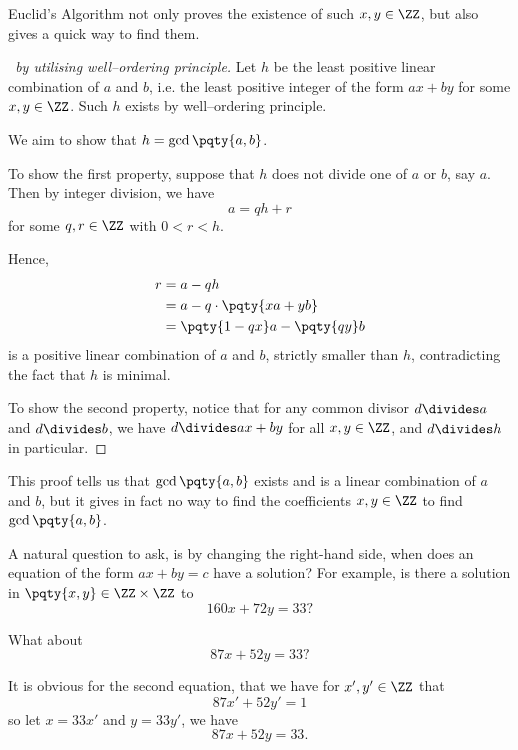 \begin{remark}
    Euclid's Algorithm not only proves the existence of such \(x, y \in \ZZ\), but also gives a quick way to find them.
\end{remark}

\begin{proof}[\proofname\ by utilising well--ordering principle]
    Let \(h\) be the least positive linear combination of \(a\) and \(b\), i.e. the least positive integer of the form \(ax + by\) for some \(x, y \in \ZZ\). Such \(h\) exists by well--ordering principle.

    We aim to show that \(h = \gcd\pqty{a, b}\).

    To show the first property, suppose that \(h\) does not divide one of \(a\) or \(b\), say \(a\). Then by integer division, we have
    \[
        a = qh + r
    \]
    for some \(q, r \in \ZZ\) with \(0 < r < h\).

    Hence,
    \begin{align*}
        r &= a - qh \\
        &= a - q \cdot \pqty{xa + yb} \\
        &= \pqty{1 - qx} a - \pqty{qy} b
    \end{align*}
    is a positive linear combination of \(a\) and \(b\), strictly smaller than \(h\), contradicting the fact that \(h\) is minimal.

    To show the second property, notice that for any common divisor \(d \divides a\) and \(d \divides b\), we have \(d \divides ax + by\) for all \(x, y \in \ZZ\), and \(d \divides h\) in particular.
\end{proof}

\begin{remark}
    This proof tells us that \(\gcd\pqty{a, b}\) exists and is a linear combination of \(a\) and \(b\), but it gives in fact no way to find the coefficients \(x, y \in \ZZ\) to find \(\gcd\pqty{a, b}\).
\end{remark}

A natural question to ask, is by changing the right-hand side, when does an equation of the form \(ax + by = c\) have a solution? For example, is there a solution in \(\pqty{x, y} \in \ZZ \times \ZZ\) to
\[
    160 x + 72 y = 33?
\]

What about
\[
    87 x + 52 y = 33?
\]

It is obvious for the second equation, that we have for \(x', y' \in \ZZ\) that
\[
    87 x' + 52 y' = 1
\]
so let \(x = 33 x'\) and \(y = 33 y'\), we have
\[
    87 x + 52 y = 33.
\]

